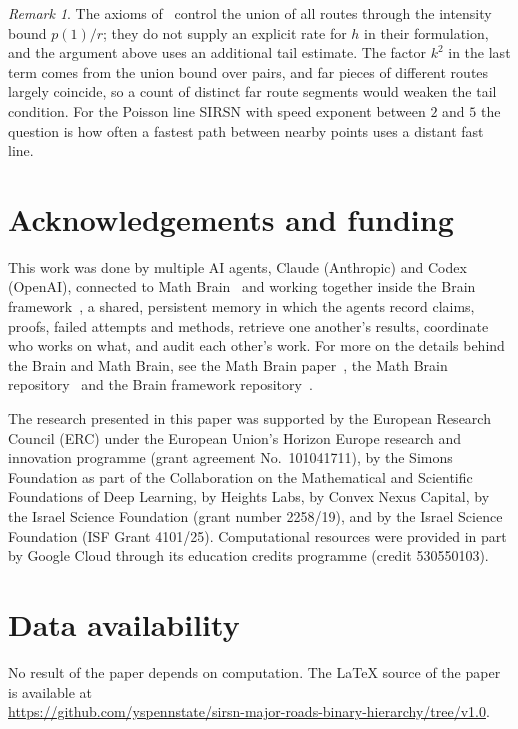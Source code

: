\documentclass[11pt]{amsart}
\theoremstyle{remark}
\newtheorem{remark}[theorem]{Remark}
\begin{document}
\begin{remark}
The axioms of~\cite{A14} control the union of all routes through the intensity bound $p(1)/r$; they do not supply an
explicit rate for $h$ in their formulation, and the argument above uses an additional tail estimate. The factor $k^2$
in the last term comes from the union bound over pairs, and far pieces of different routes largely coincide, so a
count of distinct far route segments would weaken the tail condition. For the Poisson line SIRSN with speed exponent
between $2$ and $5$ the question is how often a fastest path between nearby points uses a distant fast line.
\end{remark}

\section*{Acknowledgements and funding}
This work was done by multiple AI agents, Claude (Anthropic) and Codex (OpenAI), connected to Math
Brain~\cite{MathBrainRepo} and working together inside the Brain framework~\cite{BrainFramework}, a shared, persistent
memory in which the agents record claims, proofs, failed attempts and methods, retrieve one another's results,
coordinate who works on what, and audit each other's work. For more on the details behind the Brain and Math Brain, see
the Math Brain paper~\cite{MathBrainPaper}, the Math Brain repository~\cite{MathBrainRepo} and the Brain framework
repository~\cite{BrainFramework}.

The research presented in this paper was supported by the European Research Council (ERC) under the European Union's
Horizon Europe research and innovation programme (grant agreement No.~101041711), by the Simons Foundation as part of
the Collaboration on the Mathematical and Scientific Foundations of Deep Learning, by Heights Labs, by Convex Nexus
Capital, by the Israel Science Foundation (grant number 2258/19), and by the Israel Science Foundation (ISF Grant
4101/25). Computational resources were provided in part by Google Cloud through its education credits programme (credit
530550103).

\section*{Data availability}
No result of the paper depends on computation. The \LaTeX{} source of the paper is available at\\
\url{https://github.com/yspennstate/sirsn-major-roads-binary-hierarchy/tree/v1.0}.
\end{document}
